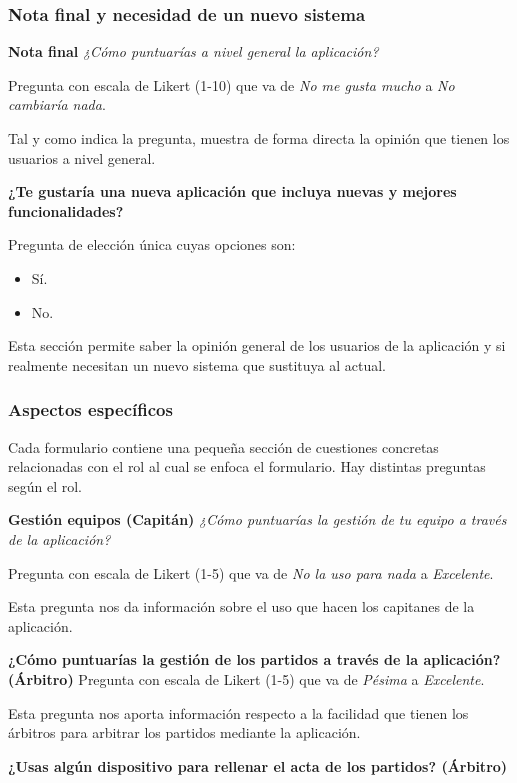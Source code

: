 \subsubsection*{Nota final y necesidad de un nuevo sistema}

\textbf{Nota final}
\emph{¿Cómo puntuarías a nivel general la aplicación?}

Pregunta con escala de Likert (1-10) que va de \emph{No me gusta mucho} a \emph{No cambiaría nada}.

Tal y como indica la pregunta, muestra de forma directa la opinión que tienen los usuarios a nivel general.

\textbf{¿Te gustaría una nueva aplicación que incluya nuevas y mejores funcionalidades?}

Pregunta de elección única cuyas opciones son:

\begin{itemize}
    \item Sí.
    \item No.
\end{itemize}

Esta sección permite saber la opinión general de los usuarios de la aplicación y si realmente necesitan un nuevo sistema que sustituya al actual.

\subsubsection*{Aspectos específicos}

Cada formulario contiene una pequeña sección de cuestiones concretas relacionadas con el rol al cual se enfoca el formulario. Hay distintas preguntas según el rol.

\textbf{Gestión equipos (Capitán)}
\emph{¿Cómo puntuarías la gestión de tu equipo a través de la aplicación?}

Pregunta con escala de Likert (1-5) que va de \emph{No la uso para nada} a \emph{Excelente}.

Esta pregunta nos da información sobre el uso que hacen los capitanes de la aplicación.

\textbf{¿Cómo puntuarías la gestión de los partidos a través de la aplicación? (Árbitro)}
Pregunta con escala de Likert (1-5) que va de \emph{Pésima} a \emph{Excelente}.

Esta pregunta nos aporta información respecto a la facilidad que tienen los árbitros para arbitrar los partidos mediante la aplicación.

\textbf{¿Usas algún dispositivo para rellenar el acta de los partidos? (Árbitro)}

